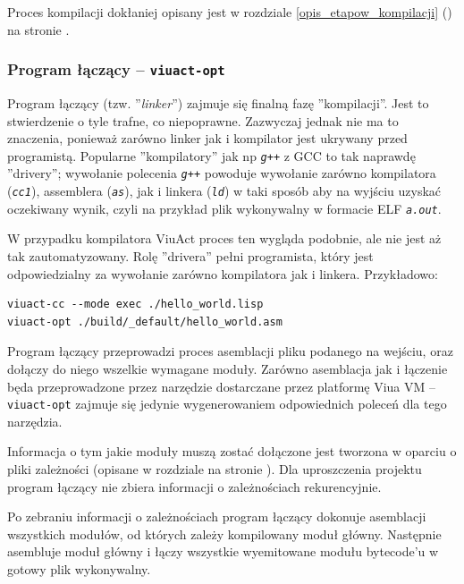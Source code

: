 \documentclass[11pt,oneside,a4paper,titlepage,onecolumn]{article}
\begin{document}
Proces kompilacji dokłaniej opisany jest w rozdziale \ref{opis_etapow_kompilacji}
() na stronie \pageref{opis_etapow_kompilacji}.

\subsubsection{Program łączący -- \texttt{viuact-opt}}
\label{opis_linkera}

Program łączący (tzw. ''\emph{linker}'') zajmuje się finalną fazę ''kompilacji''.
Jest to stwierdzenie o tyle trafne, co niepoprawne. Zazwyczaj jednak nie ma to znaczenia, ponieważ zarówno
linker jak i kompilator jest ukrywany przed programistą. Popularne ''kompilatory'' jak np \emph{\texttt{g++}}
z GCC to tak naprawdę ''drivery''; wywołanie polecenia \emph{\texttt{g++}} powoduje wywołanie zarówno
kompilatora (\emph{\texttt{cc1}}), assemblera (\emph{\texttt{as}}), jak i linkera (\emph{\texttt{ld}}) w taki
sposób aby na wyjściu uzyskać oczekiwany wynik, czyli na przykład plik wykonywalny w formacie
ELF \emph{\texttt{a.out}}.

W przypadku kompilatora ViuAct proces ten wygląda podobnie, ale nie jest aż tak zautomatyzowany.
Rolę ''drivera'' pełni programista, który jest odpowiedzialny za wywołanie zarówno kompilatora jak i linkera.
Przykładowo:

\begin{lstlisting}
viuact-cc --mode exec ./hello_world.lisp
viuact-opt ./build/_default/hello_world.asm
\end{lstlisting}

Program łączący przeprowadzi proces asemblacji pliku podanego na wejściu, oraz dołączy do niego wszelkie
wymagane moduły. Zarówno asemblacja jak i łączenie będa przeprowadzone przez narzędzie dostarczane przez
platformę Viua VM -- \texttt{viuact-opt} zajmuje się jedynie wygenerowaniem odpowiednich poleceń dla tego
narzędzia.

Informacja o tym jakie moduły muszą zostać dołączone jest tworzona w oparciu o pliki zależności (opisane w
rozdziale  na stronie \pageref{pliki_zaleznosci_modulow}).
Dla uproszczenia projektu program łączący nie zbiera informacji o zależnościach rekurencyjnie.

Po zebraniu informacji o zależnościach program łączący dokonuje asemblacji wszystkich modułów, od których
zależy kompilowany moduł główny. Następnie asembluje moduł główny i łączy wszystkie wyemitowane modułu
bytecode'u w gotowy plik wykonywalny.
\end{document}
